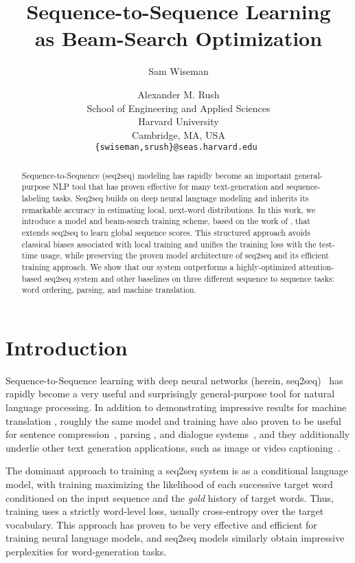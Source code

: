 \documentclass[11pt,letterpaper]{article}
\title{Sequence-to-Sequence Learning \\ as Beam-Search Optimization}
\author{Sam Wiseman \and Alexander M. Rush\\
 School of Engineering and Applied Sciences \\ Harvard University \\ Cambridge, MA, USA \\ {\tt \{swiseman,srush\}@seas.harvard.edu }}
\date{}
\begin{document}
\maketitle

\begin{abstract}
  Sequence-to-Sequence (seq2seq) modeling has rapidly become an
  important general-purpose NLP tool that has proven effective for
  many text-generation and sequence-labeling tasks. Seq2seq builds on deep neural language modeling and inherits its
  remarkable accuracy in estimating local, next-word
  distributions. In this work, we introduce a model and beam-search training
  scheme, based on the work of , that extends
  seq2seq to learn global sequence scores. This
  structured approach avoids classical biases associated with local
  training and unifies the training loss with the test-time usage,
  while preserving the proven model architecture of seq2seq and
  its efficient training approach. We show that our system outperforms a
  highly-optimized attention-based seq2seq system and other baselines
  on three different sequence to sequence tasks: word ordering,
  parsing, and machine translation.
\end{abstract}


\section{Introduction}
Sequence-to-Sequence learning with deep neural networks (herein,
seq2seq)~\cite{sutskever11generating,sutskever14sequence} has rapidly
become a very useful and surprisingly general-purpose tool for natural
language processing. In addition to demonstrating impressive results
for machine translation \cite{bahdanau15neural}, roughly the same model and training
have also proven to be useful for sentence compression~\cite{filippova15sentence}, parsing \cite{vinyals15grammar}, and dialogue systems~\cite{serban16building}, and they additionally underlie other text generation applications, such as image or video captioning~\cite{vid2text,showattend}.

The dominant approach to training a seq2seq system is as
a conditional language model, with training maximizing the likelihood of each successive target word conditioned on the input sequence and
the \textit{gold} history of target words. Thus, training uses a strictly word-level loss, usually cross-entropy over the target vocabulary. This approach has proven to be very effective and efficient for training neural language models, and seq2seq models similarly obtain impressive perplexities for word-generation tasks.
\end{document}
